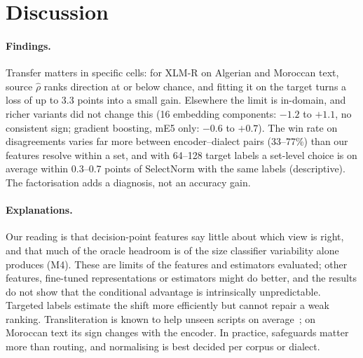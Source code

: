 \section{Discussion}
\label{sec:discussion}

\paragraph{Findings.}
Transfer matters in specific cells: for XLM-R on Algerian and Moroccan text, source $\hat\rho$ ranks direction at or below chance, and fitting it on the target turns a loss of up to 3.3 points into a small gain. Elsewhere the limit is in-domain, and richer variants did not change this (16 embedding components: $-1.2$ to $+1.1$, no consistent sign; gradient boosting, mE5 only: $-0.6$ to $+0.7$). The win rate on disagreements varies far more between encoder--dialect pairs (33--77\%) than our features resolve within a set, and with 64--128 target labels a set-level choice is on average within 0.3--0.7 points of SelectNorm with the same labels (descriptive). The factorisation adds a diagnosis, not an accuracy gain.

\paragraph{Explanations.}
Our reading is that decision-point features say little about which view is right, and that much of the oracle headroom is of the size classifier variability alone produces (M4). These are limits of the features and estimators evaluated; other features, fine-tuned representations or estimators might do better, and the results do not show that the conditional advantage is intrinsically unpredictable. Targeted labels estimate the shift more efficiently but cannot repair a weak ranking. Transliteration is known to help unseen scripts on average~\cite{muller2021unseen,moosa2023transliteration}; on Moroccan text its sign changes with the encoder. In practice, safeguards matter more than routing, and normalising is best decided per corpus or dialect.

